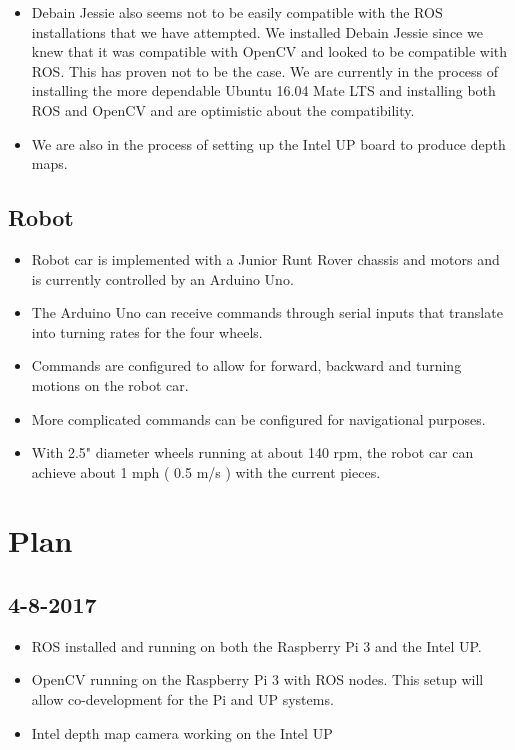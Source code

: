 \documentclass[11pt]{amsart}
\begin{document}
\begin{itemize}
\item Debain Jessie also seems not to be easily compatible with the ROS installations that we have attempted.  We installed Debain Jessie since we knew that it was compatible with OpenCV and looked to be compatible with ROS.  This has proven not to be the case.  We are currently in the process of installing the more dependable Ubuntu 16.04 Mate LTS and installing both ROS and OpenCV and are optimistic about the compatibility.
\item We are also in the process of setting up the Intel UP board to produce depth maps.
\end{itemize}

\subsection{Robot}
\begin{itemize}
\item Robot car is implemented with a Junior Runt Rover chassis and motors and is currently controlled by an Arduino Uno.
\item The Arduino Uno can receive commands through serial inputs that translate into turning rates for the four wheels.
\item Commands are configured to allow for forward, backward and turning motions on the robot car.
\item More complicated commands can be configured for navigational purposes.
\item With 2.5" diameter wheels running at about 140 rpm, the robot car can achieve about 1 mph ( 0.5 m/s ) with the current pieces.
\end{itemize}

\section{Plan}
\subsection*{4-8-2017}
\begin{itemize}
\item ROS installed and running on both the Raspberry Pi 3 and the Intel UP.
\item OpenCV running on the Raspberry Pi 3 with ROS nodes. This setup will allow co-development for the Pi and UP systems.
\item Intel depth map camera working on the Intel UP
\end{itemize}
\end{document}

